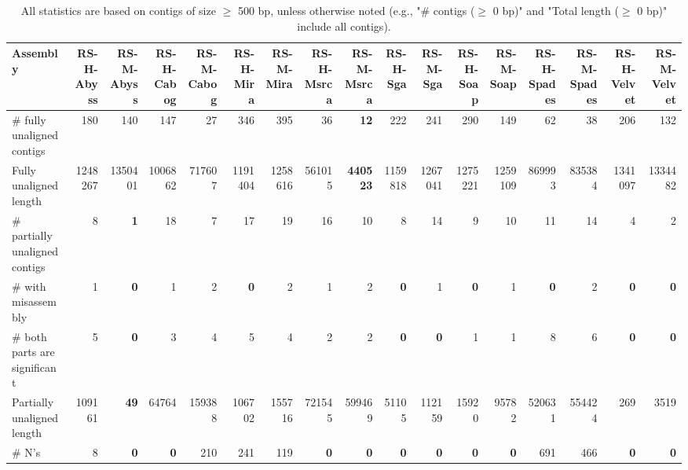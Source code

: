 \documentclass[12pt,a4paper]{article}
\begin{document}
\begin{table}[ht]
\begin{center}
\caption{All statistics are based on contigs of size $\geq$ 500 bp, unless otherwise noted (e.g., "\# contigs ($\geq$ 0 bp)" and "Total length ($\geq$ 0 bp)" include all contigs).}
\begin{tabular}{|l*{16}{|r}|}
\hline
Assembly & RS-H-Abyss & RS-M-Abyss & RS-H-Cabog & RS-M-Cabog & RS-H-Mira & RS-M-Mira & RS-H-Msrca & RS-M-Msrca & RS-H-Sga & RS-M-Sga & RS-H-Soap & RS-M-Soap & RS-H-Spades & RS-M-Spades & RS-H-Velvet & RS-M-Velvet \\ \hline
\# fully unaligned contigs & 180 & 140 & 147 & 27 & 346 & 395 & 36 & {\bf 12} & 222 & 241 & 290 & 149 & 62 & 38 & 206 & 132 \\ \hline
Fully unaligned length & 1248267 & 1350401 & 1006862 & 717607 & 1191404 & 1258616 & 561015 & {\bf 440523} & 1159818 & 1267041 & 1275221 & 1259109 & 869993 & 835384 & 1341097 & 1334482 \\ \hline
\# partially unaligned contigs & 8 & {\bf 1} & 18 & 7 & 17 & 19 & 16 & 10 & 8 & 14 & 9 & 10 & 11 & 14 & 4 & 2 \\ \hline
\hspace{5mm}\# with misassembly & 1 & {\bf 0} & 1 & 2 & {\bf 0} & 2 & 1 & 2 & {\bf 0} & 1 & {\bf 0} & 1 & {\bf 0} & 2 & {\bf 0} & {\bf 0} \\ \hline
\hspace{5mm}\# both parts are significant & 5 & {\bf 0} & 3 & 4 & 5 & 4 & 2 & 2 & {\bf 0} & {\bf 0} & 1 & 1 & 8 & 6 & {\bf 0} & {\bf 0} \\ \hline
Partially unaligned length & 109161 & {\bf 49} & 64764 & 159388 & 106702 & 155716 & 721545 & 599469 & 51105 & 112159 & 15920 & 95782 & 520631 & 554424 & 269 & 3519 \\ \hline
\# N's & 8 & {\bf 0} & {\bf 0} & 210 & 241 & 119 & {\bf 0} & {\bf 0} & {\bf 0} & {\bf 0} & {\bf 0} & {\bf 0} & 691 & 466 & {\bf 0} & {\bf 0} \\ \hline
\end{tabular}
\end{center}
\end{table}
\end{document}

